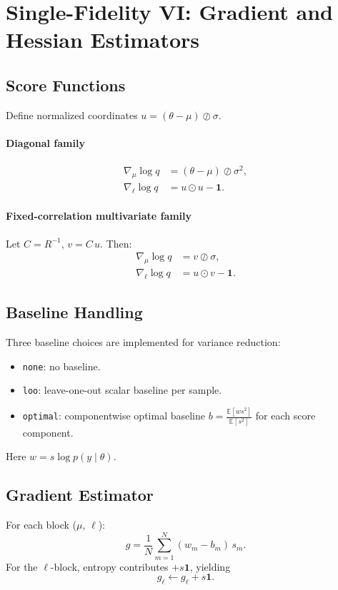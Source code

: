 \documentclass[11pt]{article}
\begin{document}
\section{Single-Fidelity VI: Gradient and Hessian Estimators}
\subsection{Score Functions}
Define normalized coordinates \(u=(\theta-\mu)\oslash \sigma\).

\paragraph{Diagonal family}
\begin{align}
\nabla_\mu \log q &= (\theta-\mu)\oslash \sigma^2,\\
\nabla_\ell \log q &= u\odot u - \mathbf{1}.
\end{align}

\paragraph{Fixed-correlation multivariate family}
Let \(C=R^{-1}\), \(v=C\,u\). Then:
\begin{align}
\nabla_\mu \log q &= v \oslash \sigma,\\
\nabla_\ell \log q &= u\odot v - \mathbf{1}.
\end{align}

\subsection{Baseline Handling}
Three baseline choices are implemented for variance reduction:
\begin{itemize}
  \item \texttt{none}: no baseline.
  \item \texttt{loo}: leave-one-out scalar baseline per sample.
  \item \texttt{optimal}: componentwise optimal baseline \(b=\frac{\mathbb{E}[w s^2]}{\mathbb{E}[s^2]}\) for each score component.
\end{itemize}
Here \(w = s\log p(y\mid\theta)\).

\subsection{Gradient Estimator}
For each block (\(\mu\), \(\ell\)):
\begin{equation}
g = \frac{1}{N}\sum_{m=1}^{N} (w_m-b_m)\,s_m.
\end{equation}
For the \(\ell\)-block, entropy contributes \(+s\mathbf{1}\), yielding
\begin{equation}
g_\ell \leftarrow g_\ell + s\mathbf{1}.
\end{equation}
\end{document}
